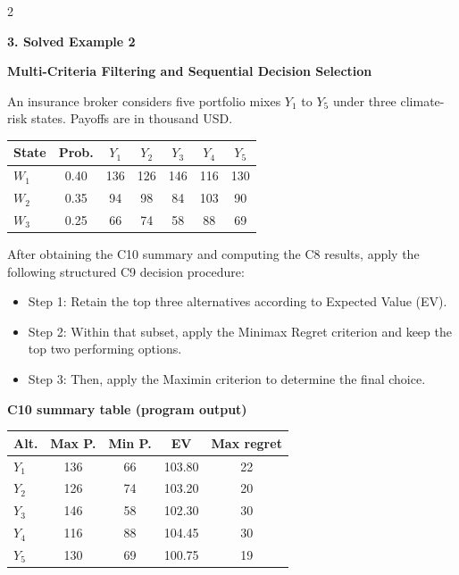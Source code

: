 \documentclass[12pt]{article}
\newcommand{\SubsectionBox}[1]{%
	\noindent\colorbox{gray!30}{%
		\parbox{\linewidth}{\textbf{#1}}%
	}\par\vspace{0.35cm}%
}
\begin{document}
\begin{multicols}{2}
		
		
		\SubsectionBox{3. Solved Example 2}
		
		\textbf{Multi-Criteria Filtering and Sequential Decision Selection}\par
		An insurance broker considers five portfolio mixes $Y_1$ to $Y_5$ under three climate-risk states. 
		Payoffs are in thousand USD.

		\begin{center}
			\begin{tabular}{l c c c c c c}
				\hline
				State & Prob. & $Y_1$ & $Y_2$ & $Y_3$ & $Y_4$ & $Y_5$ \\
				\hline
				$W_1$ & 0.40 & 136 & 126 & 146 & 116 & 130 \\
				$W_2$ & 0.35 & 94 & 98 & 84 & 103 & 90 \\
				$W_3$ & 0.25 & 66 & 74 & 58 & 88 & 69 \\
				\hline
			\end{tabular}
		\end{center}
		
		After obtaining the C10 summary and computing the C8 results, apply the following structured C9 decision procedure:
		\begin{itemize}
			\item Step 1: Retain the top three alternatives according to Expected Value (EV).
			\item Step 2: Within that subset, apply the Minimax Regret criterion and keep the top two performing options.
			\item Step 3: Then, apply the Maximin criterion to determine the final choice.
		\end{itemize}
		
		\textbf{C10 summary table (program output)}\par
		\begin{center}
			\begin{tabular}{l c c c c}
				\hline
				Alt. & Max P. & Min P. & EV & Max regret \\
				\hline
				$Y_1$ & 136 & 66 & 103.80 & 22 \\
				$Y_2$ & 126 & 74 & 103.20 & 20 \\
				$Y_3$ & 146 & 58 & 102.30 & 30 \\
				$Y_4$ & 116 & 88 & 104.45 & 30 \\
				$Y_5$ & 130 & 69 & 100.75 & 19 \\
				\hline
			\end{tabular}
		\end{center}
		

\end{multicols}
\end{document}
